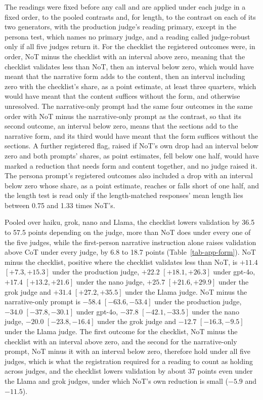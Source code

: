 The readings were fixed before any call and are applied under each judge in
a fixed order, to the pooled contrasts and, for length, to the contrast on
each of its two generators, with the production judge's reading primary,
except in the persona test, which names no primary judge, and a reading
called judge-robust only if all five judges return it. For the checklist the
registered outcomes were, in order, NoT minus the checklist with an interval
above zero, meaning that the checklist validates less than NoT, then an
interval below zero, which would have meant that the narrative form adds to
the content, then an interval including zero with the checklist's share, as
a point estimate, at least three quarters, which would have meant that the
content suffices without the form, and otherwise unresolved. The
narrative-only prompt had the same four outcomes in the same order with NoT
minus the narrative-only prompt as the contrast, so that its second outcome,
an interval below zero, means that the sections add to the narrative form,
and its third would have meant that the form suffices without the sections.
A further registered flag, raised if NoT's own drop had an interval below
zero and both prompts' shares, as point estimates, fell below one half, would
have marked a reduction that needs form and content together, and no judge
raised it. The persona prompt's registered outcomes also included a drop with
an interval below zero whose share, as a point estimate, reaches or falls
short of one half, and the length test is read only if the length-matched
responses' mean length lies between 0.75 and 1.33 times NoT's.

Pooled over haiku, grok, nano and Llama, the checklist lowers
validation by 36.5 to 57.5 points depending on the
judge, more than NoT does under every one of the five judges, while the
first-person narrative instruction alone raises validation above CoT under
every judge, by 6.8 to 18.7 points (Table~\ref{tab-app-form}).
NoT minus the checklist, positive where the checklist validates less than
NoT, is $+11.4$ $[+7.3, +15.3]$ under the production judge,
$+22.2$ $[+18.1, +26.3]$ under gpt-4o, $+17.4$ $[+13.2, +21.6]$ under the nano
judge, $+25.7$ $[+21.6, +29.9]$ under the grok judge and
$+31.4$ $[+27.2, +35.5]$ under the Llama judge.
NoT minus the narrative-only prompt is $-58.4$ $[-63.6, -53.4]$ under the
production judge, $-34.0$ $[-37.8, -30.1]$ under gpt-4o, $-37.8$
$[-42.1, -33.5]$ under the nano judge, $-20.0$ $[-23.8, -16.4]$ under
the grok judge and $-12.7$ $[-16.3, -9.5]$ under the Llama judge.
The first outcome for the checklist, NoT minus the checklist with an
interval above zero, and the second for the narrative-only prompt, NoT minus
it with an interval below zero, therefore hold under all five judges, which
is what the registration required for a reading to count as holding across
judges, and the checklist lowers
validation by about 37 points even under
the Llama and grok judges, under which NoT's own reduction is small ($-5.9$ and
$-11.5$).

